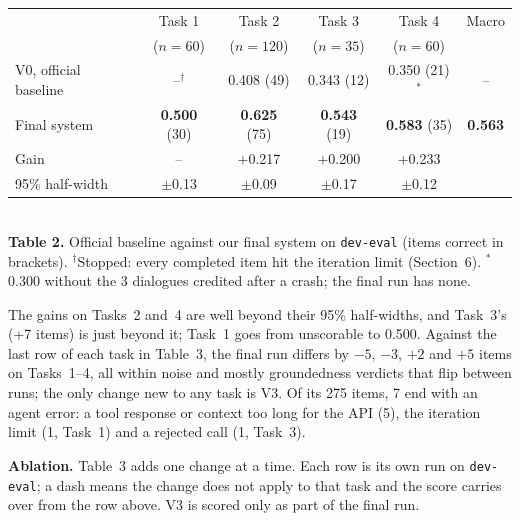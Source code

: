 \documentclass[10pt]{article}
\begin{document}
\begin{center}\small
\begin{tabular}{@{}lccccc@{}}
\toprule
 & Task 1 & Task 2 & Task 3 & Task 4 & Macro \\
 & ($n{=}60$) & ($n{=}120$) & ($n{=}35$) & ($n{=}60$) & \\
\midrule
V0, official baseline & --$^{\dagger}$ & 0.408 (49) & 0.343 (12) & 0.350 (21)$^{\ast}$ & -- \\
Final system          & \textbf{0.500} (30) & \textbf{0.625} (75) & \textbf{0.543} (19) & \textbf{0.583} (35) & \textbf{0.563} \\
\midrule
Gain                  & -- & +0.217 & +0.200 & +0.233 & \\
95\% half-width       & $\pm$0.13 & $\pm$0.09 & $\pm$0.17 & $\pm$0.12 & \\
\bottomrule
\end{tabular}\\[0.2em]
{\footnotesize \textbf{Table 2.} Official baseline against our final system on \texttt{dev-eval}
(items correct in brackets). $^{\dagger}$Stopped: every completed item hit the iteration limit
(Section~6). $^{\ast}$0.300 without the 3 dialogues credited after a crash; the final run has
none.}
\end{center}

The gains on Tasks~2 and~4 are well beyond their 95\% half-widths, and Task~3's (+7 items) is
just beyond it; Task~1 goes from unscorable to 0.500. Against the last row of each task in
Table~3, the final run differs by $-5$, $-3$, $+2$ and $+5$ items on Tasks~1--4, all within
noise and mostly groundedness verdicts that flip between runs; the only change new to any task
is V3.
Of its 275 items, 7 end with an agent error: a tool response or context too long for the API (5),
the iteration limit (1, Task~1) and a rejected call (1, Task~3).

\textbf{Ablation.} Table~3 adds one change at a time. Each row is its own run on
\texttt{dev-eval}; a dash means the change does not apply to that task and the score carries
over from the row above. V3 is scored only as part of the final run.
\end{document}
